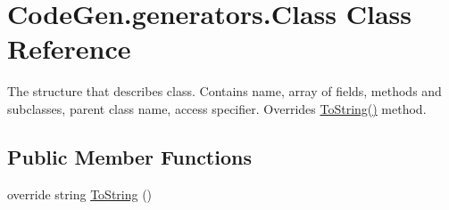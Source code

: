 \hypertarget{classCodeGen_1_1generators_1_1Class}{}\section{Code\+Gen.\+generators.\+Class Class Reference}
\label{classCodeGen_1_1generators_1_1Class}


The structure that describes class. Contains name, array of fields, methods and subclasses, parent class name, access specifier. Overrides \mbox{\hyperlink{classCodeGen_1_1generators_1_1Class_a3d8c15ddeed8faad666f9dfdd53b758f}{To\+String()}} method.  


\subsection*{Public Member Functions}
\begin{DoxyCompactItemize}
\item 
override string \mbox{\hyperlink{classCodeGen_1_1generators_1_1Class_a3d8c15ddeed8faad666f9dfdd53b758f}{To\+String}} ()
\end{DoxyCompactItemize}
